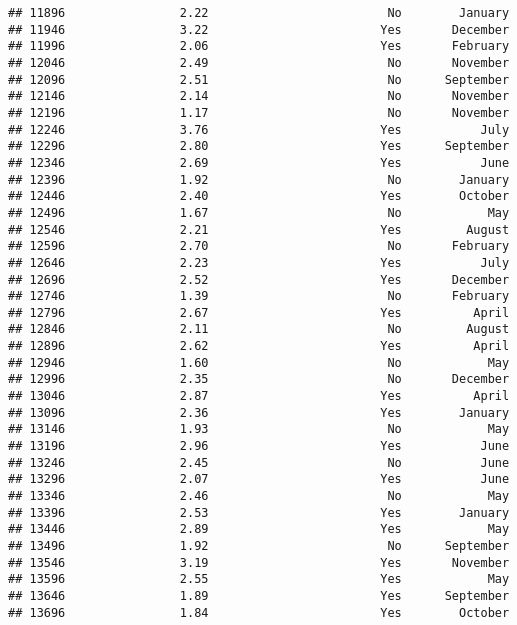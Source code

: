 \documentclass[
]{article}
\begin{document}
\begin{verbatim}
## 11896                2.22                         No        January
## 11946                3.22                        Yes       December
## 11996                2.06                        Yes       February
## 12046                2.49                         No       November
## 12096                2.51                         No      September
## 12146                2.14                         No       November
## 12196                1.17                         No       November
## 12246                3.76                        Yes           July
## 12296                2.80                        Yes      September
## 12346                2.69                        Yes           June
## 12396                1.92                         No        January
## 12446                2.40                        Yes        October
## 12496                1.67                         No            May
## 12546                2.21                        Yes         August
## 12596                2.70                         No       February
## 12646                2.23                        Yes           July
## 12696                2.52                        Yes       December
## 12746                1.39                         No       February
## 12796                2.67                        Yes          April
## 12846                2.11                         No         August
## 12896                2.62                        Yes          April
## 12946                1.60                         No            May
## 12996                2.35                         No       December
## 13046                2.87                        Yes          April
## 13096                2.36                        Yes        January
## 13146                1.93                         No            May
## 13196                2.96                        Yes           June
## 13246                2.45                         No           June
## 13296                2.07                        Yes           June
## 13346                2.46                         No            May
## 13396                2.53                        Yes        January
## 13446                2.89                        Yes            May
## 13496                1.92                         No      September
## 13546                3.19                        Yes       November
## 13596                2.55                        Yes            May
## 13646                1.89                        Yes      September
## 13696                1.84                        Yes        October

\end{verbatim}
\end{document}
